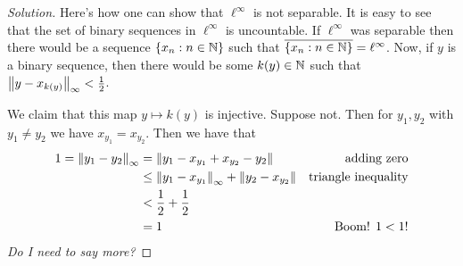 \begin{proof}[Solution]
     Here's how one can show that $\ell ^{\infty}$ is not separable. It is easy to see that the set of binary sequences in $\ell ^{\infty}$ is uncountable. If $\ell ^{\infty}$ was separable then there would be a sequence $\left\{ x_{n} : n\in \mathbb N \right\}$ such that $\overline {\left\{ x_{n} : n\in \mathbb N \right\}} =\ell ^{\infty}$. Now, if $y $ is a binary sequence, then there would be some $k(y) \in \mathbb N$ such that $\left\lVert y-x_{k(y)} \right\rVert_{\infty} < \frac{1}{2}$. 

     We claim that this map $y \mapsto k(y)$ is injective. Suppose not. Then for $y_{1}, y_{2}$ with $y_{1} \ne y_{2}$ we have $x_{y_{1}}=x_{y_{2}}$. Then we have that 
     \begin{align*}
	 1=\left\lVert y_{1} - y_{2} \right\rVert_{\infty} &= \left\lVert y_{1} - x_{y_{1}} + x_{y_{2}} - y_{2} \right\rVert & \text{adding zero}\\
	 & \le \left\lVert y_1 - x_{y_{1}} \right\rVert_{\infty} + \left\lVert y_{2} - x_{y_{2}} \right\rVert & \text{triangle inequality} \\
	 &< \frac{1}{2} + \frac{1}{2} \\
	 &=1 & \text{Boom! } 1<1\text{!}
     \end{align*}
     \textit{Do I need to say more?}
\end{proof}
